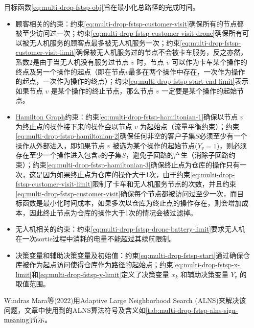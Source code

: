 目标函数\ref{eq:multi-drop-fstsp-obj}旨在最小化总路径的完成时间。

\begin{itemize}
    \item \colorbox{shallow-green}{顾客相关的约束：}约束\ref{eq:multi-drop-fstsp-customer-visit}确保所有的节点都被至少访问过一次；约束\ref{eq:multi-drop-fstsp-customer-visit-drone}确保所有可以被无人机服务的顾客点最多被无人机服务一次；约束\ref{eq:multi-drop-fstsp-customer-visit-limit}确保被无人机服务过的节点不会被卡车服务，反之亦然，系数2是由于当无人机没有服务过节点 $v$ 时，节点 $v$ 可以作为卡车某个操作的终点及另一个操作的起点（即在节点$v$最多在两个操作中存在，一次作为操作的起点，一次作为操作的终点）；约束\ref{eq:multi-drop-fstsp-start-end-limit}表示如果节点 $v$ 是某个操作的终止节点，那么节点 $v$ 一定要是某个操作的起始节点。 
    \item \colorbox{shallow-blue}{\href{https://www.wikiwand.com/en/articles/Hamiltonian\%20path}{Hamilton Graph}约束：}约束\ref{eq:multi-drop-fstsp-hamiltonian-1}确保以节点 $v$ 为终止点的操作接下来的操作会以节点 $v$ 为起始点（流量平衡约束）；约束\ref{eq:multi-drop-fstsp-hamiltonian-2}确保任何非空的客户子集$S$必须至少有一个操作从外部进入，即如果节点 $v$ 被选为某个操作的起始节点($Y_v = 1$)，则必须存在至少一个操作进入包含$v$的子集$S$，避免子回路的产生（消除子回路约束）；约束\ref{eq:multi-drop-fstsp-hamiltonian-3}确保终止点为仓库的操作只有一次，这是因为如果终止点为仓库的操作大于1次，由于约束\ref{eq:multi-drop-fstsp-customer-visit-limit}限制了卡车和无人机服务节点的次数，并且约束\ref{eq:multi-drop-fstsp-customer-visit}确保每个节点都被访问过至少一次，而目标函数是最小化时间成本，如果多次以仓库为终止点的操作存在，则会增加成本，因此终止节点为仓库的操作大于1次的情况会被过滤掉。
    \item \colorbox{shallow-red}{无人机相关的约束：}约束\ref{eq:multi-drop-fstsp-drone-battery-limit}要求无人机在一次sortie过程中消耗的电量不能超过其续航限制。
    \item 决策变量和辅助决策变量及初始值：约束\ref{eq:multi-drop-fstsp-start}通过确保仓库被作为起点访问使得仓库作为路径的起始点；约束\ref{eq:multi-drop-fstsp-x-limit}和\ref{eq:multi-drop-fstsp-y-limit}定义了决策变量 $x_k$ 和辅助决策变量 $Y_v$ 的取值范围。 
\end{itemize}

Windras Mara等(2022)\cite{windrasmaraAdaptiveLargeNeighborhood2022}用Adaptive Large Neighborhood Search (ALNS)来解决该问题，文章中使用到的ALNS算法符号及含义如\ref{tab:multi-drop-fstsp-alns-sign-meaning}所示。

